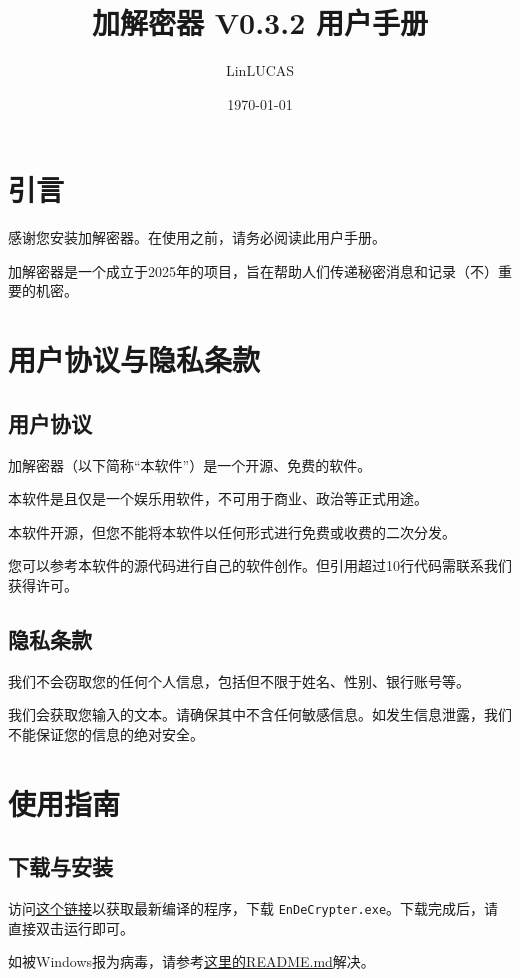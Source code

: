 \documentclass{article}
\title{加解密器 V0.3.2 用户手册}
\author{LinLUCAS}
\date{\today}
\begin{document}
\maketitle
\newpage
\tableofcontents
\newpage
\section{引言}
感谢您安装加解密器。在使用之前，请务必阅读此用户手册。

加解密器是一个成立于2025年的项目，旨在帮助人们传递秘密消息和记录（不）重要的机密。
\section{用户协议与隐私条款}

\subsection{用户协议}

加解密器（以下简称“本软件”）是一个开源、免费的软件。

本软件是且仅是一个娱乐用软件，不可用于商业、政治等正式用途。

本软件开源，但您不能将本软件以任何形式进行免费或收费的二次分发。

您可以参考本软件的源代码进行自己的软件创作。但引用超过10行代码需联系我们获得许可。

\subsection{隐私条款}

我们不会窃取您的任何个人信息，包括但不限于姓名、性别、银行账号等。

我们会获取您输入的文本。请确保其中不含任何敏感信息。如发生信息泄露，我们不能保证您的信息的绝对安全。

\section{使用指南}

\subsection{下载与安装}

访问\href{https://github.com/Lucas-Linlin/EnDeCrypter/releases/latest}{这个链接}以获取最新编译的程序，下载 \lstinline|EnDeCrypter.exe|。下载完成后，请直接双击运行即可。

如被Windows报为病毒，请参考\href{https://github.com/Lucas-Linlin/EnDeCrypter/}{这里的README.md}解决。
\end{document}
